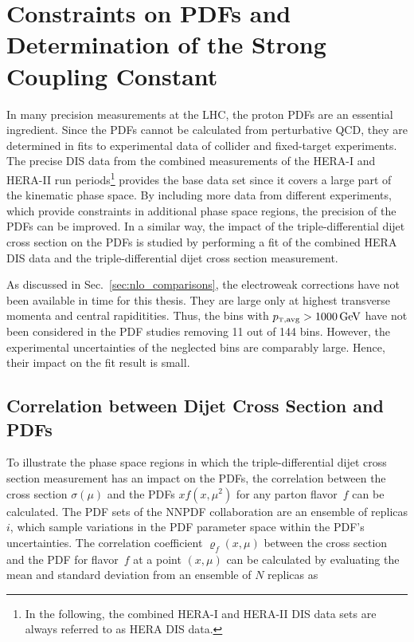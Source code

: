 
\chapter[Constraints on PDFs and Determination of the Strong Coupling
Constant]{Constraints on PDFs and Determination of the Strong Coupling Constant}
\label{sec:pdf_constraints}

In many precision measurements at the LHC, the proton PDFs are an essential
ingredient. Since the PDFs cannot be calculated from perturbative QCD, they are
determined in fits to experimental data of collider and fixed-target experiments.
The precise DIS data from the combined measurements of the HERA-I and HERA-II
run periods\footnote{In the following, the combined HERA-I and HERA-II DIS data sets
are always referred to as HERA DIS data.} provides the base data set since it
covers a large part of the kinematic phase space. By including more data from different
experiments, which provide constraints in additional phase space regions, the
precision of the PDFs can be improved. In a similar way, the impact of the
triple-differential dijet cross section on the PDFs is studied by performing a
fit of the combined HERA DIS data and the triple-differential dijet cross
section measurement.

As discussed in Sec.~\ref{sec:nlo_comparisons}, the electroweak corrections have
not been available in time for this thesis. They are large only at highest
transverse momenta and central rapiditities. Thus, the bins with $\ptavg >
\SI{1000}{\GeV}$ have not been considered in the PDF studies removing 11 out of 144
bins. However, the experimental uncertainties of the neglected bins are
comparably large. Hence, their impact on the fit result is small.

\section{Correlation between Dijet Cross Section and PDFs}
\label{sec:pdf_sensitivity}

To illustrate the phase space regions in which the triple-differential dijet
cross section measurement has an impact on the PDFs, the correlation between the cross
section $\sigma(\mu)$ and the PDFs $xf(x,\mu^2)$ for any parton flavor~$f$ can be
calculated. The PDF sets of the NNPDF collaboration are an ensemble of replicas
$i$, which sample variations in the PDF parameter space within the PDF's
uncertainties. The correlation coefficient $\varrho_f(x,\mu)$ between the cross
section and the PDF for flavor~$f$ at a point $(x,\mu)$ can be calculated by
evaluating the mean and standard deviation from an ensemble of $N$ replicas as

